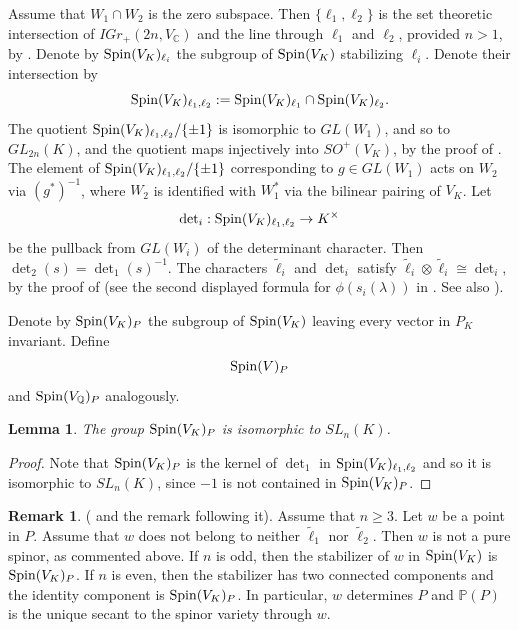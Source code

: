 \documentclass[12pt]{amsart}
\numberwithin{equation}{subsection}
\theoremstyle{plain}
\newtheorem{lem}[thm]{Lemma}
\theoremstyle{definition}
\newtheorem{rem}[thm]{Remark}
\newcommand{\CC}{{\mathbb C}}
\newcommand{\QQ}{{\mathbb Q}}
\newcommand{\PP}{{\mathbb P}}
\newcommand{\Spin}{{\rm Spin}}
\begin{document}
 Assume that $W_1\cap W_2$ is the zero subspace. Then $\{\ell_1,\ell_2\}$ is the set theoretic intersection of $IGr_+(2n,V_\CC)$ and the line through $\ell_1$ and $\ell_2$, provided $n>1$, by \cite[III.1.12]{chevalley}.
Denote by $\Spin(V_K)_{\ell_i}$ the subgroup of $\Spin(V_K)$ stabilizing $\ell_i$. Denote their intersection by
\begin{equation}
\label{eq-spin-V-K-ell-1-ell-2}
\Spin(V_K)_{\ell_1,\ell_2}:=\Spin(V_K)_{\ell_1}\cap \Spin(V_K)_{\ell_2}.
\end{equation}
The quotient $\Spin(V_K)_{\ell_1,\ell_2}/\{\pm 1\}$ 
is isomorphic to $GL(W_1)$, and so to $GL_{2n}(K)$, and the quotient maps injectively into $SO^+(V_K)$, by the proof of \cite[Lemma 1]{igusa}.  The element of $\Spin(V_K)_{\ell_1,\ell_2}/\{\pm 1\}$ corresponding to $g\in GL(W_1)$ acts on $W_2$ via $(g^*)^{-1}$, where $W_2$ is identified with $W_1^*$ via the bilinear pairing of $V_K$. 
Let 
\[
{\det}_i: \Spin(V_K)_{\ell_1,\ell_2}\rightarrow K^\times
\]
be the pullback from $GL(W_i)$ of the determinant character. Then $\det_2(s)=\det_1(s)^{-1}$.
The characters $\tilde{\ell}_i$ and $\det_i$ satisfy $\tilde{\ell}_i\otimes \tilde{\ell}_i\cong \det_i$,
by the proof of \cite[Lemma 1]{igusa} (see the second displayed formula for $\phi(s_i(\lambda))$ in \cite[Sec. 2]{igusa}. See also \cite[III.3.2]{chevalley}). 

 Denote by $\Spin(V_K)_P$ the subgroup of 
 $\Spin(V_K)$ leaving every vector in $P_K$ invariant. 
 Define 
 \begin{equation}
 \label{eq-Spin(V)_P}
 \Spin(V)_P
 \end{equation} 
 and $\Spin(V_\QQ)_P$ analogously.
 
 \begin{lem}
 \label{lemma-Spin-V-K-is-SL-n-K}
 The group $\Spin(V_K)_P$ is isomorphic to $SL_n(K)$.
 \end{lem}
 
 \begin{proof}
 Note that $\Spin(V_K)_P$ is the kernel of $\det_1$ in 
 $\Spin(V_K)_{\ell_1,\ell_2}$ and so it is isomorphic to $SL_n(K)$, since $-1$ is not contained in $\Spin(V_K)_P$. 
 \end{proof}
 
 \begin{rem} 
 \label{remark-stabilizer-of-w-may-have-two-connected-components}
 (\cite[Lemma 2]{igusa} and the remark following it).
 Assume that $n\geq 3$.
 Let $w$ be a point in $P$. Assume that $w$ does not belong to neither $\tilde{\ell}_1$ nor $\tilde{\ell}_2$. 
 Then $w$ is not a pure spinor, as commented above.
 If $n$ is odd, then the stabilizer of $w$ in $\Spin(V_K)$ is $\Spin(V_K)_P$. If $n$ is even, then the stabilizer has two connected components and the identity component is $\Spin(V_K)_P$. In particular, $w$ determines $P$ and $\PP(P)$ is the unique secant to the spinor variety through $w$.
 \end{rem}
 
\end{document}
